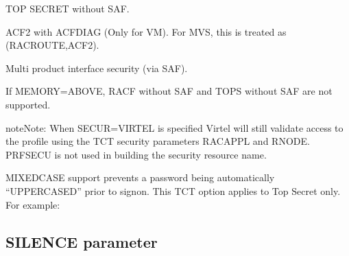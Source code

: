 \documentclass[letterpaper,10pt,english]{sphinxmanual}
\begin{document}
\sphinxAtStartPar
{} \sphinxhyphen{} TOP SECRET without SAF.

\sphinxAtStartPar
{} \sphinxhyphen{} ACF2 with ACFDIAG (Only for VM). For MVS, this is treated as (RACROUTE,ACF2).

\sphinxAtStartPar
{} \sphinxhyphen{} Multi product interface security (via SAF).

\sphinxAtStartPar
If MEMORY=ABOVE, RACF without SAF and TOPS without SAF are not supported.

\begin{sphinxadmonition}{note}{Note:}
\sphinxAtStartPar
When SECUR=VIRTEL is specified Virtel will still validate access to the profile using the TCT security parameters RACAPPL and RNODE. PRFSECU is not used in building the security resource name.
\end{sphinxadmonition}

\newpage

\sphinxAtStartPar
MIXEDCASE support prevents a password being automatically “UPPERCASED” prior to signon. This TCT option applies to Top Secret only. For example:\sphinxhyphen{}

\begin{sphinxVerbatim}[commandchars=\\\{\}]
         


       
\end{sphinxVerbatim}

\ignorespaces 

\subsection{SILENCE parameter}
\label{\detokenize{Installation_Guide:silence-parameter}}\label{\detokenize{Installation_Guide:index-114}}
\begin{sphinxVerbatim}[commandchars=\\\{\}]
 
\end{sphinxVerbatim}
\end{document}
